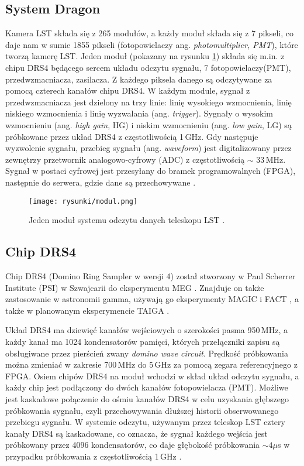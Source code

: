 \documentclass[a4paper,11pt,twoside]{article}
\begin{document}
\subsection{System Dragon}
Kamera LST składa się z 265 modułów, a każdy moduł składa się z 7 pikseli, co daje nam w sumie 1855 pikseli (fotopowielaczy ang. \textsl{photomultiplier, PMT}), które tworzą kamerę LST. Jeden moduł (pokazany na rysunku \ref{fig:drs4}) składa się m.in. z chipu DRS4 będącego sercem układu odczytu sygnału, 7 fotopowielaczy(PMT), przedwzmacniacza, zasilacza.
Z każdego piksela danego są odczytywane za pomocą czterech kanałów chipu DRS4. W każdym module, sygnał z przedwzmacniacza jest dzielony na trzy linie: linię wysokiego wzmocnienia, linię niskiego wzmocnienia i linię wyzwalania (ang. \textsl{trigger}). Sygnały o wysokim wzmocnieniu (ang. \textsl{high gain}, HG) i niskim wzmocnieniu (ang. \textsl{low gain}, LG) są próbkowane przez układ DRS4 z częstotliwością 1\,GHz. Gdy następuje wyzwolenie sygnału, przebieg sygnału (ang. \textsl{waveform}) jest digitalizowany przez zewnętrzy przetwornik analogowo-cyfrowy (ADC) z częstotliwością $\sim$ 33\,MHz. Sygnał w postaci cyfrowej jest przesyłany do bramek programowalnych (FPGA), następnie do serwera, gdzie dane są przechowywane \cite{dragon_lst}. 
\begin{figure}[H] 
\centering
\texttt{[image: rysunki/modul.png]}
\caption{Jeden moduł systemu odczytu danych teleskopu LST \cite{lst_report}.}
\label{fig:drs4}
\end{figure}
\subsection{Chip DRS4}
Chip DRS4 (Domino Ring Sampler w wersji 4) został stworzony w Paul Scherrer Institute (PSI) w Szwajcarii do eksperymentu MEG \cite{meg_experiment}.
Znajduje on także zastosowanie w astronomii gamma, używają go eksperymenty MAGIC \cite{magic_hardware} i FACT \cite{fact}, a także w planowanym eksperymencie TAIGA \cite{tunka}.

Układ DRS4 ma dziewięć kanałów wejściowych o szerokości pasma 950\,MHz, a każdy kanał ma 1024 kondensatorów pamięci, których przełączniki zapisu są obsługiwane przez pierścień zwany \textsl{domino wave circuit}. Prędkość próbkowania można zmieniać w zakresie 700\,MHz do 5\,GHz za pomocą zegara referencyjnego z FPGA. Osiem chipów DRS4 na moduł wchodzi w skład układ odczytu sygnału, a każdy chip jest podłączony do dwóch kanałów fotopowielacza (PMT). Możliwe jest kaskadowe połączenie do ośmiu kanałów DRS4 w celu uzyskania głębszego próbkowania sygnału, czyli przechowywania dłuższej historii obserwowanego przebiegu sygnału. W systemie odczytu, używanym przez teleskop LST cztery kanały DRS4 są kaskadowane, co oznacza, że sygnał każdego wejścia jest próbkowany przez 4096 kondensatorów, co daje głębokość próbkowania $\sim 4 \mathtt{\mu}$s w przypadku próbkowania z częstotliwością 1\,GHz \cite{dragon_lst}.
\end{document}
